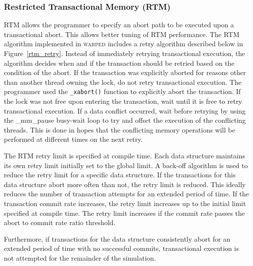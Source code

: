 \documentclass{sig-alternate}
\begin{document}
\subsubsection{Restricted Transactional Memory (RTM)}


RTM allows the programmer to specify an abort path to be executed upon a transactional
abort.  This allows better tuning of RTM performance.  The RTM algorithm implemented in
\textsc{warped} includes a retry algorithm described below in Figure~\ref{rtm_retry}.
Instead of immediately retrying transactional execution, the algorithm decides when and if
the transaction should be retried based on the condition of the abort.  If the transaction
was explicitly aborted for reasons other than another thread owning the lock, do not retry
transactional execution.  The programmer used the \texttt{\_xabort()} function to
explicitly abort the transaction. If the lock was not free upon entering the transaction,
wait until it is free to retry transactional execution.  If a data conflict occurred, wait
before retrying by using the \_mm\_pause busy-wait loop to try and offset the execution of
the conflicting threads. This is done in hopes that the conflicting memory operations will
be performed at different times on the next retry.

The RTM retry limit is specified at compile time.  Each data structure maintains its own
retry limit initially set to the global limit.  A back-off algorithm is used to reduce the
retry limit for a specific data structure.  If the transactions for this data structure
abort more often than not, the retry limit is reduced.  This ideally reduces the number of
transaction attempts for an extended period of time.  If the transaction commit rate
increases, the retry limit increases up to the initial limit specified at compile time.
The retry limit increases if the commit rate passes the abort to commit rate ratio
threshold.

Furthermore, if transactions for the data structure consistently abort for an extended
period of time with no successful commits, transactional execution is not attempted for
the remainder of the simulation.
\end{document}
